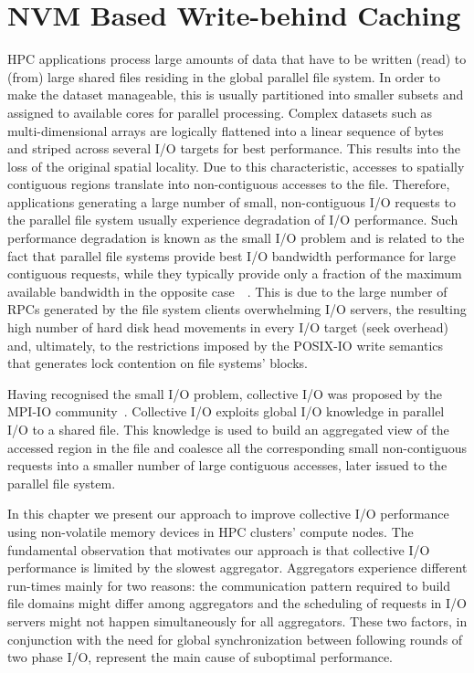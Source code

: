 \chapter{NVM Based Write-behind Caching} \label{chapt: checkpointing}
HPC applications process large amounts of data that have to be written (read) to (from) large shared files residing in the global parallel file system. In order to make the dataset manageable, 
this is usually partitioned into smaller subsets and assigned to available cores for parallel processing. Complex datasets such as multi-dimensional arrays are logically flattened into a linear 
sequence of bytes and striped across several I/O targets for best performance. This results into the loss of the original spatial locality. Due to this characteristic, accesses to spatially contiguous 
regions translate into non-contiguous accesses to the file. Therefore, applications generating a large number of small, non-contiguous I/O requests to the parallel file system usually experience 
degradation of I/O performance. Such performance degradation is known as the small I/O problem and is related to the fact that parallel file systems provide best I/O bandwidth performance for large 
contiguous requests, while they typically provide only a fraction of the maximum available bandwidth in the opposite case~\cite{ChingCLP06}~\cite{HeSSYT11}. This is due to the large number of RPCs 
generated by the file system clients overwhelming I/O servers, the resulting high number of hard disk head movements in every I/O target (seek overhead) and, ultimately, to the restrictions imposed 
by the POSIX-IO write semantics that generates lock contention on file systems' blocks.

Having recognised the small I/O problem, collective I/O was proposed by the MPI-IO community~\cite{ThakurGL99}. Collective I/O exploits global I/O knowledge in parallel I/O to a shared file. This 
knowledge is used to build an aggregated view of the accessed region in the file and coalesce all the corresponding small non-contiguous requests into a smaller number of large contiguous accesses, 
later issued to the parallel file system. 

In this chapter we present our approach to improve collective I/O performance using non-volatile memory devices in HPC clusters' compute nodes. The fundamental observation that motivates our approach 
is that collective I/O performance is limited by the slowest aggregator. Aggregators experience different run-times mainly for two reasons: the communication pattern required to build file domains might 
differ among aggregators and the scheduling of requests in I/O servers might not happen simultaneously for all aggregators. These two factors, in conjunction with the need for global synchronization 
between following rounds of two phase I/O, represent the main cause of suboptimal performance.

